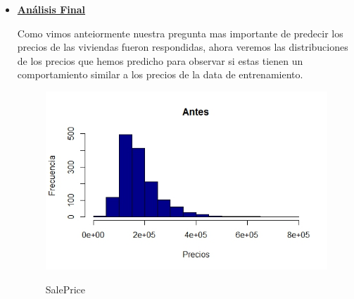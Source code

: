 \documentclass{report}
\begin{document}
\begin{itemize}
\begin{itemize}
\begin{lstlisting}[frame=single]
modelo<-lm(SalePrice~.,f_numeric[1:1460,])
p3<-predict(modelo,newdata=f_numeric[1461:2919,])
p4<-as.matrix(p3)

error1<-referencia$SalePrice-p3

rmse(error1)

count1=0
for (i in 1:1459) {
if (abs(error1[i])<=10000){count1 = count1 +1}
else{count1 = count1}

}

rmse(error1)
count1
\end{lstlisting}

\begin{lstlisting}[frame=single]
[1] 71437.27

[2] 136
\end{lstlisting}
\vspace{2mm}

Esto significa que 136 viviendas caen dentro del rango de un error menor a 10.000\$ lo cual representa el 9\% de precision con respecto a la data de referencia.\\
\end{itemize}

\newpage

\item \textbf{\underline{Análisis Final}}
\vspace{2mm}

Como vimos anteiormente nuestra pregunta mas importante de predecir los precios de las viviendas fueron respondidas, ahora veremos las distribuciones de los precios que hemos predicho para observar si estas tienen un comportamiento similar a los precios de la data de entrenamiento.\\


\begin{figure}[h]
	\centering
	\includegraphics[scale=0.8]{Precios1.JPEG}
	\label{p1}
	\caption{SalePrice}
\end{figure}


\end{itemize}
\end{document}
